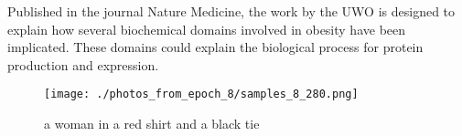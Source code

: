 \documentclass{article}%
\begin{document}
Published in the journal Nature Medicine, the work by the UWO is designed to explain how several biochemical domains involved in obesity have been implicated. These domains could explain the biological process for protein production and expression.\newline%

%


\begin{figure}[h!]%
\centering%
\texttt{[image: ./photos\_from\_epoch\_8/samples\_8\_280.png]}%
\caption{a woman in a red shirt and a black tie}%
\end{figure}

%
\end{document}
